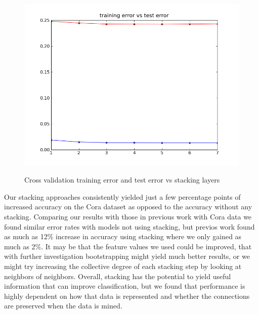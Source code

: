 \documentclass[a4paper,11pt]{article}
\begin{document}
\begin{figure}[!ht]
  \caption{Cross validation training error and test error vs stacking layers}
  \centering
  \includegraphics[width=4.5in]{WU5/CrossValidation.png}
  \label{figures:f3}
\end{figure}

\newpage

Our stacking approaches consistently yielded just a few percentage points of
increased accuracy on the Cora dataset as opposed to the accuracy without any stacking. 
Comparing our results with those in previous work with Cora data \footnotemark[\value{footnote}]
we found similar error rates with models not using stacking, but previos work found as much as
12\% increase in accuracy using stacking where we only gained as much as 2\%. It may be that the
feature values we used could be improved, that with further investigation bootstrapping might yield
much better results, or we might try increasing the collective degree of each stacking step by 
looking at neighbors of neighbors. Overall, stacking has the potential to yield useful information
that can improve classification, but we found that performance is highly dependent on how that data is represented and whether
the connections are preserved when the data is mined.
\end{document}
